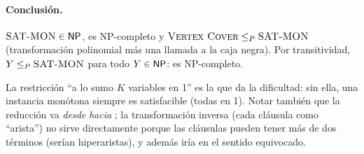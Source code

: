 \paragraph{Conclusión.} $\textsc{SAT-MON}\in\mathsf{NP}$, \VC{} es NP-completo y $\textsc{Vertex Cover}\le_P\textsc{SAT-MON}$ (transformación polinomial
más una llamada a la caja negra). Por transitividad, $Y\le_P\textsc{SAT-MON}$ para todo $Y\in\mathsf{NP}$: \SATMON{} es
NP-completo.

\begin{observacion}
La restricción ``a lo sumo $K$ variables en 1'' es la que da la dificultad: sin ella, una instancia monótona
siempre es satisfacible (todas en 1). Notar también que la reducción va \emph{desde} \VC{} \emph{hacia}
\SATMON; la transformación inversa (cada cláusula como ``arista'') no sirve directamente porque las cláusulas
pueden tener más de dos términos (serían hiperaristas), y además iría en el sentido equivocado.
\end{observacion}


